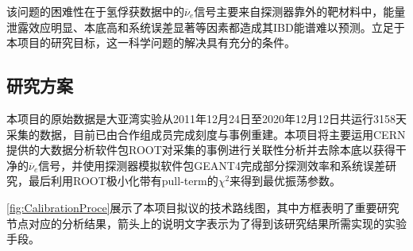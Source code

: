 \documentclass[a4paper,zihao=-4]{article}
\begin{document}
该问题的困难性在于氢俘获数据中的$\overline{\nu}_e$信号主要来自探测器靠外的靶材料中，能量泄露效应明显、本底高和系统误差显著等因素都造成其IBD能谱难以预测。立足于本项目的研究目标，这一科学问题的解决具有充分的条件。


\subsection{研究方案}

本项目的原始数据是大亚湾实验从2011年12月24日至2020年12月12日共运行3158天采集的数据，目前已由合作组成员完成刻度与事例重建。本项目将主要运用CERN提供的大数据分析软件包ROOT对采集的事例进行关联性分析并去除本底以获得干净的$\overline{\nu}_e$信号，并使用探测器模拟软件包GEANT4完成部分探测效率和系统误差研究，最后利用ROOT极小化带有pull-term的$\chi^2$来得到最优振荡参数。

\cref{fig:CalibrationProce}展示了本项目拟议的技术路线图，其中方框表明了重要研究节点对应的分析结果，箭头上的说明文字表示为了得到该研究结果所需实现的实验手段。
\end{document}
